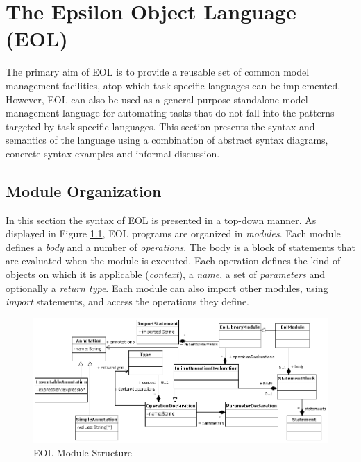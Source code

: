 \chapter{The Epsilon Object Language (EOL)}
\label{sec:Design.EOL}

The primary aim of EOL is to provide a reusable set of common model management facilities, atop which task-specific languages can be implemented. However, EOL can also be used as a general-purpose standalone model management language for automating tasks that do not fall into the patterns targeted by task-specific languages. This section presents the syntax and semantics of the language using a combination of abstract syntax diagrams, concrete syntax examples and informal discussion.

\section{Module Organization}
\label{sec:Design.EOL.Syntax}
In this section the syntax of EOL is presented in a top-down manner. As displayed in Figure \ref{fig:EOL.Module}, EOL programs are organized in \emph{modules}. Each module defines a \emph{body} and a number of \emph{operations}. The body is a block of statements that are evaluated when the module is executed. Each operation defines the kind of objects on which it is applicable (\emph{context}), a \emph{name}, a set of \emph{parameters} and optionally a \emph{return type}. Each module can also import other modules, using \emph{import} statements, and access the operations they define.

\label{sec:Design.EOL.ModuleStucture}
\begin{landscape}
\begin{figure}
	\centering
		\includegraphics{images/EOLModule.png}
	\caption{EOL Module Structure}
	\label{fig:EOL.Module}
\end{figure}
\end{landscape}

